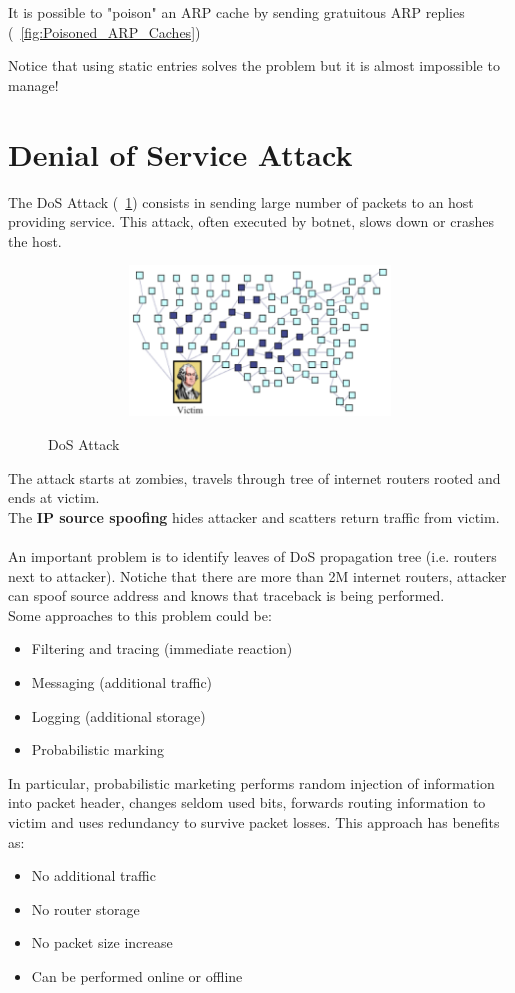 It is possible to "poison" an ARP cache by sending gratuitous ARP replies (\figurename ~\ref{fig:Poisoned_ARP_Caches})

Notice that using static entries solves the problem but it is almost impossible to manage!

\section{Denial of Service Attack}
The DoS Attack (\figurename ~\ref{fig:DoS_Attack}) consists in sending large number of packets to an host providing service. This attack, often executed by botnet, slows down or crashes the host.\\ 
\begin{figure}[htbp]
	\centering%
	\subfigure%
	{\includegraphics[height=4cm, width=12cm, keepaspectratio]{Immagini/Capitolo11/DoS_Attack.png}}
	\caption{DoS Attack\label{fig:DoS_Attack}} 	
\end{figure}
The attack starts at zombies, travels through tree of internet routers rooted and ends at victim.\\
The \textbf{IP source spoofing} hides attacker and scatters return traffic from victim.\\ \\
An important problem is to identify leaves of DoS propagation tree (i.e. routers next to attacker). Notiche that there are more than 2M internet routers, attacker can spoof source address and knows that traceback is being performed.\\
Some approaches to this problem could be:
\begin{itemize}
\item Filtering and tracing (immediate reaction)
\item Messaging (additional traffic)
\item Logging (additional storage)
\item Probabilistic marking
\end{itemize}
In particular, probabilistic marketing performs random injection of information into packet header, changes seldom used bits, forwards routing information to victim and uses redundancy to survive packet losses. This approach has benefits as:
\begin{itemize}
\item No additional traffic
\item No router storage
\item No packet size increase
\item Can be performed online or offline
\end{itemize}

